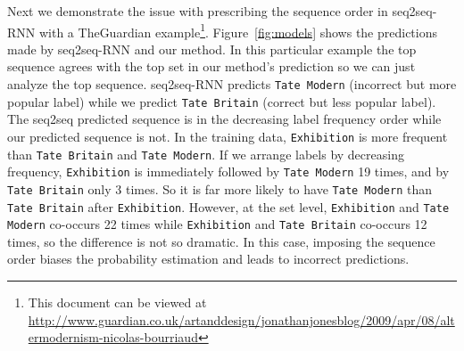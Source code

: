 Next we demonstrate the issue with prescribing the sequence order in seq2seq-RNN with a TheGuardian example\footnote{\scriptsize This document can be viewed at \url{http://www.guardian.co.uk/artanddesign/jonathanjonesblog/2009/apr/08/altermodernism-nicolas-bourriaud}}. Figure~\ref{fig:models} shows the predictions made by seq2seq-RNN and our method. In this particular example the top sequence agrees with the top set in our method's prediction so we can just analyze the top sequence. seq2seq-RNN predicts \texttt{Tate Modern} (incorrect but more popular label) while we predict \texttt{Tate Britain} (correct but less popular label). The seq2seq predicted sequence is in the decreasing label frequency order while our predicted sequence is not. In the training data, \texttt{Exhibition} is more frequent than \texttt{Tate Britain} and \texttt{Tate Modern}. If we arrange labels by decreasing frequency, \texttt{Exhibition} is immediately followed by \texttt{Tate Modern} 19 times, and by \texttt{Tate Britain} only 3 times. So it is far more likely to have \texttt{Tate Modern} than \texttt{Tate Britain} after \texttt{Exhibition}. However, at the set level, \texttt{Exhibition} and \texttt{Tate Modern} co-occurs 22 times while \texttt{Exhibition} and \texttt{Tate Britain} co-occurs 12 times, so the difference is not so dramatic. In this case, imposing the sequence order biases the probability estimation and leads to incorrect predictions.
%
%
%


